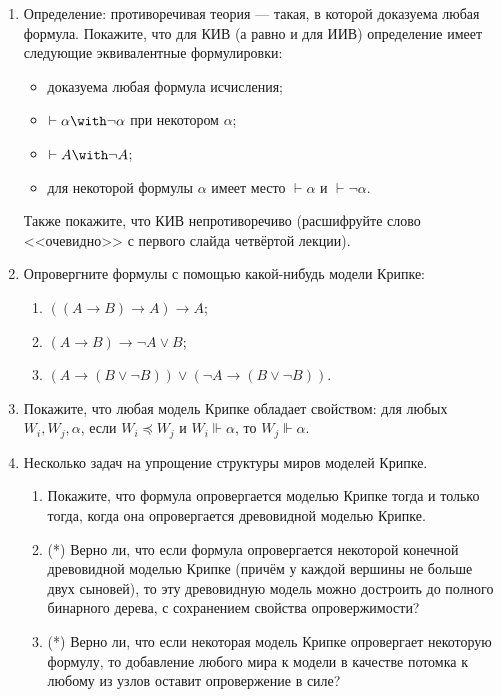 \documentclass[10pt,a4paper,oneside]{article}
\begin{document}
\begin{enumerate}
\item Определение: противоречивая теория --- такая, в которой доказуема любая формула. 
Покажите, что для КИВ (а равно и для ИИВ) определение имеет следующие эквивалентные формулировки:
\begin{itemize}
\item доказуема любая формула исчисления;
\item $\vdash\alpha\with\neg\alpha$ при некотором $\alpha$;
\item $\vdash A\with\neg A$;
\item для некоторой формулы $\alpha$ имеет место $\vdash\alpha$ и $\vdash\neg\alpha$. 
\end{itemize}

Также покажите, что КИВ непротиворечиво (расшифруйте слово <<очевидно>> с первого слайда четвёртой лекции).

\item Опровергните формулы с помощью какой-нибудь модели Крипке:
\begin{enumerate}
\item $((A\rightarrow B) \rightarrow A) \rightarrow A$;
\item $(A\rightarrow B) \rightarrow \neg A \vee B$;
\item $(A \rightarrow (B \vee \neg B)) \vee (\neg A \rightarrow (B \vee \neg B))$.
\end{enumerate}

\item Покажите, что любая модель Крипке обладает свойством: для любых $W_i, W_j, \alpha$, 
если $W_i \preceq W_j$ и $W_i \Vdash \alpha$, то $W_j \Vdash \alpha$.

\item Несколько задач на упрощение структуры миров моделей Крипке.
\begin{enumerate}
\item Покажите, что формула опровергается моделью Крипке тогда и только тогда, когда она
опровергается древовидной моделью Крипке.

\item (*) Верно ли, что если формула опровергается некоторой конечной древовидной моделью Крипке (причём
у каждой вершины не больше двух сыновей), то эту 
древовидную модель можно достроить до полного бинарного дерева, с сохранением свойства опровержимости?

\item (*) Верно ли, что если некоторая модель Крипке опровергает некоторую формулу,
то добавление любого мира к модели в качестве потомка к любому из узлов оставит опровержение в силе?
\end{enumerate}


\end{enumerate}
\end{document}
